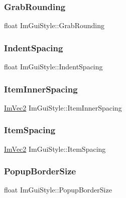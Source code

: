 \subsubsection{\texorpdfstring{Grab\+Rounding}{GrabRounding}}
{\footnotesize\ttfamily float Im\+Gui\+Style\+::\+Grab\+Rounding}

\hypertarget{struct_im_gui_style_a32ea292dee2b4e178a227acacd061921}{}\label{struct_im_gui_style_a32ea292dee2b4e178a227acacd061921} 
\subsubsection{\texorpdfstring{Indent\+Spacing}{IndentSpacing}}
{\footnotesize\ttfamily float Im\+Gui\+Style\+::\+Indent\+Spacing}

\hypertarget{struct_im_gui_style_a1a12021be99583fb491cff2df75d1ae1}{}\label{struct_im_gui_style_a1a12021be99583fb491cff2df75d1ae1} 
\subsubsection{\texorpdfstring{Item\+Inner\+Spacing}{ItemInnerSpacing}}
{\footnotesize\ttfamily \hyperlink{struct_im_vec2}{Im\+Vec2} Im\+Gui\+Style\+::\+Item\+Inner\+Spacing}

\hypertarget{struct_im_gui_style_a6bc07d81e049cd75e86e6b3753c0da4a}{}\label{struct_im_gui_style_a6bc07d81e049cd75e86e6b3753c0da4a} 
\subsubsection{\texorpdfstring{Item\+Spacing}{ItemSpacing}}
{\footnotesize\ttfamily \hyperlink{struct_im_vec2}{Im\+Vec2} Im\+Gui\+Style\+::\+Item\+Spacing}

\hypertarget{struct_im_gui_style_ac3bc5e785e360f72b580d419953c9db4}{}\label{struct_im_gui_style_ac3bc5e785e360f72b580d419953c9db4} 
\subsubsection{\texorpdfstring{Popup\+Border\+Size}{PopupBorderSize}}
{\footnotesize\ttfamily float Im\+Gui\+Style\+::\+Popup\+Border\+Size}

